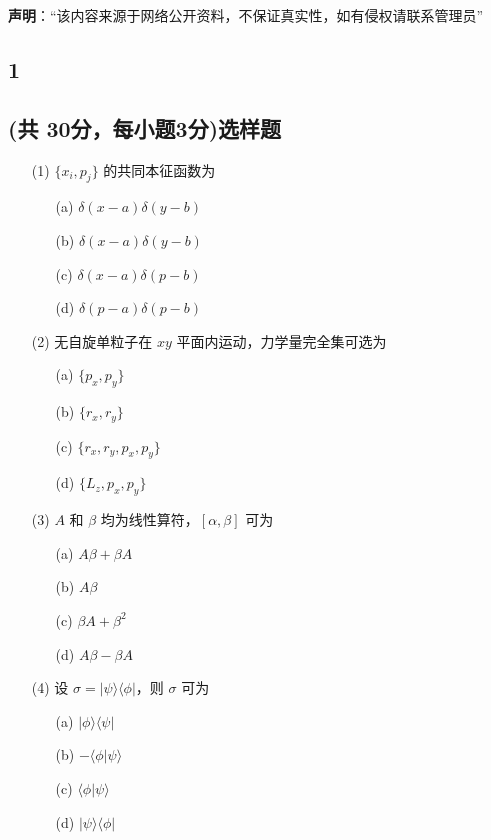 
\textbf{声明}：“该内容来源于网络公开资料，不保证真实性，如有侵权请联系管理员”

\subsection{1}
\subsection{(共 30分，每小题3分)选样题}
\begin{enumerate}
    \item[(1)] $\{x_i, p_j\}$ 的共同本征函数为 
    \begin{itemize}
        \item[(a)] $\delta(x-a)\delta(y-b)$
        \item[(b)] $\delta(x-a)\delta(y-b)$
        \item[(c)] $\delta(x-a)\delta(p-b)$
        \item[(d)] $\delta(p-a)\delta(p-b)$
    \end{itemize}
    
    \item[(2)] 无自旋单粒子在 $xy$ 平面内运动，力学量完全集可选为 
    \begin{itemize}
        \item[(a)] $\{p_x, p_y\}$
        \item[(b)] $\{r_x, r_y\}$
        \item[(c)] $\{r_x, r_y, p_x, p_y\}$
        \item[(d)] $\{L_z, p_x, p_y\}$
    \end{itemize}

    \item[(3)] $A$ 和 $\beta$ 均为线性算符，$[\alpha, \beta]$ 可为 
    \begin{itemize}
        \item[(a)] $A\beta + \beta A$
        \item[(b)] $A\beta$
        \item[(c)] $\beta A + \beta^2$
        \item[(d)] $A\beta - \beta A$
    \end{itemize}

    \item[(4)] 设 $\sigma = |\psi\rangle \langle\phi|$，则 $\sigma$ 可为 
    \begin{itemize}
        \item[(a)] $|\phi\rangle \langle\psi|$
        \item[(b)] $-\langle\phi|\psi\rangle$
        \item[(c)] $\langle\phi|\psi\rangle$
        \item[(d)] $|\psi\rangle \langle\phi|$
    \end{itemize}
\end{enumerate}
